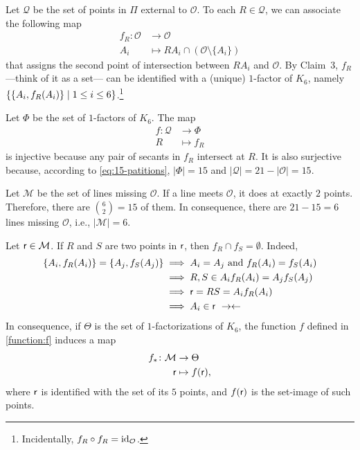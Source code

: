 \begin{solution}
\begin{description}
        Let $\mathcal Q$ be the set of points in $\Pi$ external to $\mathcal O$. To each $R\in\mathcal Q$, we can associate the following map
        \begin{align*}
            f_R\colon\mathcal O&\to\mathcal O\\
            A_i&\mapsto RA_i\cap(\mathcal O\setminus\{A_i\})
        \end{align*}
        that assigns the second point of intersection between $RA_i$ and $\mathcal O$. By Claim~3, $f_R$ ---think of it as a set--- can be identified with a (unique) $1$-factor of $K_6$, namely $\{\{A_i,f_R(A_i)\}\mid 1\le i\le 6\}$.\footnote{Incidentally, $f_R\circ f_R=\operatorname{id}_{\mathcal O}$.}

        Let $\Phi$ be the set of $1$-factors of $K_6$. The map
        \begin{align}\label{function:f}
            f\colon\mathcal Q&\to\Phi\\
            R&\mapsto f_R
        \end{align}
        is injective because any pair of secants in $f_R$ intersect at $R$. It is also surjective because, according to \eqref{eq:15-patitions}, $|\Phi|=15$ and $|\mathcal Q|=21-|\mathcal O|=15$.

        Let $\mathcal M$ be the set of lines missing $\mathcal O$. If a line meets $\mathcal O$, it does at exactly $2$ points. Therefore, there are $\binom62=15$ of them. In consequence, there are $21-15=6$ lines missing $\mathcal O$, i.e., $|\mathcal M|=6$.
        
        Let $\mathsf r\in\mathcal M$. If $R$ and $S$ are two points in $\mathsf r$, then $f_R\cap f_S=\emptyset$. Indeed,
        \begin{align*}
            \{A_i,f_R(A_i)\}=\{A_j,f_S(A_j)\}
                &\implies A_i=A_j \text{ and }f_R(A_i)=f_S(A_i)\\
                &\implies R,S\in A_if_R(A_i)=A_jf_S(A_j)\\
                &\implies \block r=RS=A_if_R(A_i)\\
                &\implies A_i\in\block r\ \noend
        \end{align*}
        In consequence, if $\Theta$ is the set of $1$-factorizations of $K_6$, the function $f$ defined in \eqref{function:f} induces a map
        \begin{align*}
            f_*\colon\mathcal M&\to\Theta\\
            \mathsf r&\mapsto f(\mathsf r),
        \end{align*}
        where $\mathsf r$ is identified with the set of its $5$ points, and $f(\mathsf r)$ is the set-image of such points.
        

\end{description}
\end{solution}
